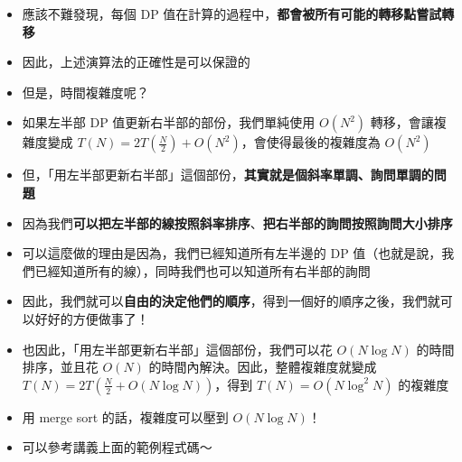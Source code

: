 \documentclass[standalone]{beamer}
\begin{document}
\begin{frame}{}
  \begin{itemize}
    \item 應該不難發現，每個 DP 值在計算的過程中，\textbf{都會被所有可能的轉移點嘗試轉移}
    \item 因此，上述演算法的正確性是可以保證的
    \item 但是，時間複雜度呢？
    \item 如果左半部 DP 值更新右半部的部份，我們單純使用 $O(N^2)$ 轉移，會讓複雜度變成 $T(N) = 2T(\frac{N}{2}) + O(N^2)$，會使得最後的複雜度為 $O(N^2)$
    \item 但，「用左半部更新右半部」這個部份，\textbf{其實就是個斜率單調、詢問單調的問題}
  \end{itemize}
\end{frame}

\begin{frame}{}
  \begin{itemize}
    \item 因為我們\textbf{可以把左半部的線按照斜率排序}、\textbf{把右半部的詢問按照詢問大小排序}
    \item 可以這麼做的理由是因為，我們已經知道所有左半邊的 DP 值（也就是說，我們已經知道所有的線），同時我們也可以知道所有右半部的詢問
    \item 因此，我們就可以\textbf{自由的決定他們的順序}，得到一個好的順序之後，我們就可以好好的方便做事了！
    \item 也因此，「用左半部更新右半部」這個部份，我們可以花 $O(N \log N)$ 的時間排序，並且花 $O(N)$ 的時間內解決。因此，整體複雜度就變成 $T(N) = 2T(\frac{N}{2} + O(N \log N))$，得到 $T(N) = O(N \log^2 N)$ 的複雜度
    \item 用 merge sort 的話，複雜度可以壓到 $O(N \log N)$！
    \item 可以參考講義上面的範例程式碼～
  \end{itemize}
\end{frame}
\end{document}

